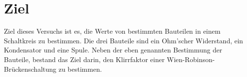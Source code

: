 \section{Ziel}
\label{sec:Ziel}
Ziel dieses Versuchs ist es, die Werte von bestimmten Bauteilen in einem Schaltkreis zu bestimmen. Die drei Bauteile sind ein Ohm'scher Widerstand, ein Kondensator
und eine Spule. Neben der eben genannten Bestimmung der Bauteile, bestand das Ziel darin, den Klirrfaktor einer Wien-Robinson-Brückenschaltung zu bestimmen.
